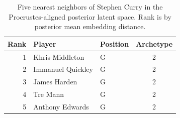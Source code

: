 \begin{table}[htbp]
  \centering\small
  \begin{tabular}{rllc}
    \toprule
    Rank & Player & Position & Archetype \\
    \midrule
    1 & Khris Middleton & G & 2 \\
    2 & Immanuel Quickley & G & 2 \\
    3 & James Harden & G & 2 \\
    4 & Tre Mann & G & 2 \\
    5 & Anthony Edwards & G & 2 \\
    \bottomrule
  \end{tabular}
  \caption{Five nearest neighbors of Stephen Curry in the Procrustes-aligned posterior latent space. Rank is by posterior mean embedding distance.}
  \label{tab:Stephen_Curry_neighbors}
\end{table}

